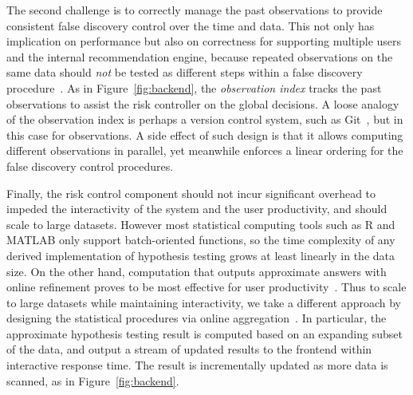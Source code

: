 The second challenge is to correctly manage the past observations to provide consistent false discovery control over the time and data.  This not only has implication on performance but also on correctness for supporting multiple users and the \system{} internal recommendation engine, because repeated observations on the same data should \textit{not} be tested as different steps within a false discovery procedure~\cite{zhao2016controlling}.  As in Figure~\ref{fig:backend}, the \textit{observation index} tracks the past observations to assist the risk controller on the global decisions. A loose analogy of the observation index is perhaps a version control system, such as Git~\cite{torvalds2010git}, but in this case for observations. A side effect of such design is that it allows computing different observations in parallel, yet meanwhile enforces a linear ordering for the false discovery control procedures.

Finally, the risk control component should not incur significant overhead to impeded the interactivity of the system and the user productivity, and should scale to large datasets.  However most statistical computing tools such as R\cite{R} and MATLAB\cite{matlab} only support batch-oriented functions, so the time complexity of any derived implementation of hypothesis testing grows at least linearly in the data size.  On the other hand, computation that outputs approximate answers with online refinement proves to be most effective for user productivity~\cite{zgraggen2016progressive}. Thus to scale to large datasets while maintaining interactivity, we take a different approach by designing the statistical procedures via online aggregation~\cite{onlineagg}. In particular, the approximate hypothesis testing result is computed based on an expanding subset of the data, and output a stream of updated results to the frontend within interactive response time. The result is incrementally updated as more data is scanned, as in Figure~\ref{fig:backend}. 